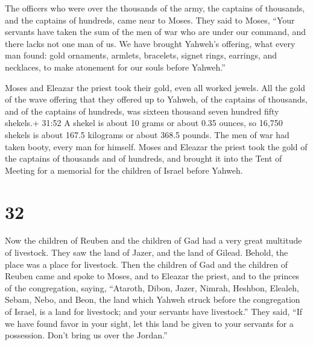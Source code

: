 The officers who were over the thousands of the army, the
captains of thousands, and the captains of hundreds, came near to Moses.
 They said to Moses, ``Your servants have taken the sum of
the men of war who are under our command, and there lacks not one man of
us.  We have brought Yahweh's offering, what every man
found: gold ornaments, armlets, bracelets, signet rings, earrings, and
necklaces, to make atonement for our souls before Yahweh.''

 Moses and Eleazar the priest took their gold, even all
worked jewels.  All the gold of the wave offering that they
offered up to Yahweh, of the captains of thousands, and of the captains
of hundreds, was sixteen thousand seven hundred fifty shekels.+ 31:52 A
shekel is about 10 grams or about 0.35 ounces, so 16,750 shekels is
about 167.5 kilograms or about 368.5 pounds.  The men of
war had taken booty, every man for himself.  Moses and
Eleazar the priest took the gold of the captains of thousands and of
hundreds, and brought it into the Tent of Meeting for a memorial for the
children of Israel before Yahweh.

\hypertarget{section-31}{%
\section{32}\label{section-31}}

 Now the children of Reuben and the children of Gad had a
very great multitude of livestock. They saw the land of Jazer, and the
land of Gilead. Behold, the place was a place for livestock.
 Then the children of Gad and the children of Reuben came
and spoke to Moses, and to Eleazar the priest, and to the princes of the
congregation, saying,  ``Ataroth, Dibon, Jazer, Nimrah,
Heshbon, Elealeh, Sebam, Nebo, and Beon,  the land which
Yahweh struck before the congregation of Israel, is a land for
livestock; and your servants have livestock.''  They said,
``If we have found favor in your sight, let this land be given to your
servants for a possession. Don't bring us over the Jordan.''

